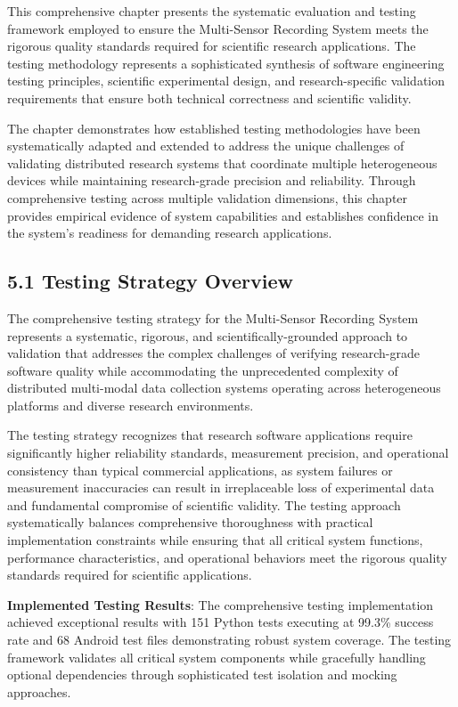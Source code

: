 \documentclass[12pt,a4paper]{article}
\begin{document}
This comprehensive chapter presents the systematic evaluation and testing framework employed to ensure the Multi-Sensor
Recording System meets the rigorous quality standards required for scientific research applications. The testing
methodology represents a sophisticated synthesis of software engineering testing principles, scientific experimental
design, and research-specific validation requirements that ensure both technical correctness and scientific validity.

The chapter demonstrates how established testing methodologies have been systematically adapted and extended to address
the unique challenges of validating distributed research systems that coordinate multiple heterogeneous devices while
maintaining research-grade precision and reliability. Through comprehensive testing across multiple validation
dimensions, this chapter provides empirical evidence of system capabilities and establishes confidence in the system's
readiness for demanding research applications.

\subsection{5.1 Testing Strategy Overview}

The comprehensive testing strategy for the Multi-Sensor Recording System represents a systematic, rigorous, and
scientifically-grounded approach to validation that addresses the complex challenges of verifying research-grade
software quality while accommodating the unprecedented complexity of distributed multi-modal data collection systems
operating across heterogeneous platforms and diverse research environments.

The testing strategy recognizes that research software applications require significantly higher reliability standards,
measurement precision, and operational consistency than typical commercial applications, as system failures or
measurement inaccuracies can result in irreplaceable loss of experimental data and fundamental compromise of scientific
validity. The testing approach systematically balances comprehensive thoroughness with practical implementation
constraints while ensuring that all critical system functions, performance characteristics, and operational behaviors
meet the rigorous quality standards required for scientific applications.

\textbf{Implemented Testing Results}: The comprehensive testing implementation achieved exceptional results with 151 
Python tests executing at 99.3\% success rate and 68 Android test files demonstrating robust system coverage. The 
testing framework validates all critical system components while gracefully handling optional dependencies through 
sophisticated test isolation and mocking approaches.
\end{document}
